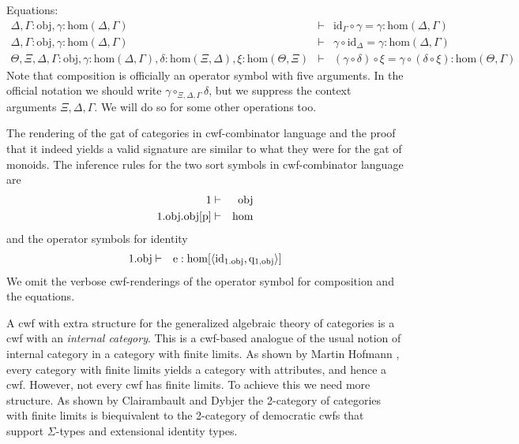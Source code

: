 \documentclass{lmcs}
\def\Obj{\mathrm{obj}}
\def\Ctx{\mathrm{Ctx}}
\def\Hom{\mathrm{hom}}
\def\id{\mathrm{id}}
\def\idmon{\mathrm{e}}
\begin{document}
Equations:
\begin{eqnarray*}
\Delta, \Gamma : \Obj, \gamma : \Hom(\Delta,\Gamma) &\vdash& \id_\Gamma \circ \gamma = \gamma : \Hom(\Delta,\Gamma)\\
\Delta, \Gamma : \Obj, \gamma : \Hom(\Delta,\Gamma) &\vdash& \gamma \circ \id_\Delta = \gamma : \Hom(\Delta,\Gamma)\\
\Theta, \Xi,\Delta,\Gamma : \Obj, \gamma : \Hom(\Delta,\Gamma), \delta : \Hom(\Xi,\Delta), \xi : \Hom(\Theta,\Xi) &\vdash&
(\gamma \circ \delta) \circ \xi = \gamma \circ (\delta \circ \xi): \Hom(\Theta,\Gamma)
\end{eqnarray*}
Note that composition is officially an operator symbol with five arguments. In the official notation we should write $\gamma \circ_{\Xi,\Delta,\Gamma} \delta$, but we suppress the context arguments $\Xi,\Delta,\Gamma$. We will do so for some other operations too.

The rendering of the gat of categories in cwf-combinator language and the proof that it indeed yields a valid signature are similar to what they were for the gat of monoids. The inference rules for the two sort symbols in cwf-combinator language are
\begin{eqnarray*}
1 &\vdash& \Obj\\
1.\Obj.\Obj[\p] &\vdash& \Hom
\end{eqnarray*}
and the operator symbols for identity
\begin{eqnarray*}
1.\Obj &\vdash& \idmon : \Hom[\tuple{\id_{1.\Obj},\q_{1,\Obj}}]
\end{eqnarray*}
We omit the verbose cwf-renderings of the operator symbol for composition and the equations.

A cwf with extra structure for the generalized algebraic theory of categories is a cwf with an {\em internal category}. This is a cwf-based analogue of the usual notion of internal category in a category with finite limits. As shown by Martin Hofmann \cite{hofmann:csl,hofmann:cambridge}, every category with finite limits yields a category with attributes, and hence a cwf. However, not every cwf has finite limits. To achieve this we need more structure. As shown by Clairambault and Dybjer \cite{ClairambaultD11,ClairambaultD14} the 2-category of categories with finite limits is biequivalent to the 2-category of democratic cwfs that support $\Sigma$-types and extensional identity types.
\end{document}
